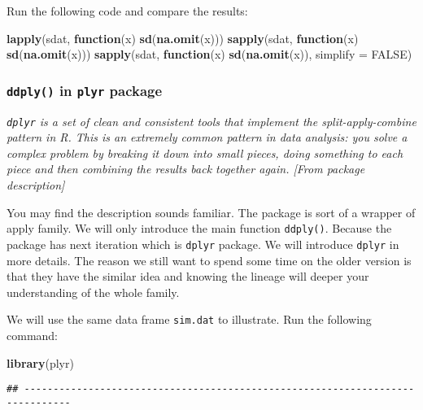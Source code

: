 \documentclass[
]{article}
\newenvironment{Shaded}{\begin{snugshade}}{\end{snugshade}}
\newcommand{\ControlFlowTok}[1]{\textcolor[rgb]{0.13,0.29,0.53}{\textbf{#1}}}
\newcommand{\DataTypeTok}[1]{\textcolor[rgb]{0.13,0.29,0.53}{#1}}
\newcommand{\KeywordTok}[1]{\textcolor[rgb]{0.13,0.29,0.53}{\textbf{#1}}}
\newcommand{\NormalTok}[1]{#1}
\newcommand{\OtherTok}[1]{\textcolor[rgb]{0.56,0.35,0.01}{#1}}
\begin{document}
Run the following code and compare the results:

\begin{Shaded}
\begin{Highlighting}[]
\KeywordTok{lapply}\NormalTok{(sdat, }\ControlFlowTok{function}\NormalTok{(x) }\KeywordTok{sd}\NormalTok{(}\KeywordTok{na.omit}\NormalTok{(x)))}
\KeywordTok{sapply}\NormalTok{(sdat, }\ControlFlowTok{function}\NormalTok{(x) }\KeywordTok{sd}\NormalTok{(}\KeywordTok{na.omit}\NormalTok{(x)))}
\KeywordTok{sapply}\NormalTok{(sdat, }\ControlFlowTok{function}\NormalTok{(x) }\KeywordTok{sd}\NormalTok{(}\KeywordTok{na.omit}\NormalTok{(x)), }\DataTypeTok{simplify =} \OtherTok{FALSE}\NormalTok{)}
\end{Highlighting}
\end{Shaded}

\hypertarget{ddply-in-plyr-package}{%
\subsubsection{\texorpdfstring{\texttt{ddply()} in \texttt{plyr}
package}{ddply() in plyr package}}\label{ddply-in-plyr-package}}

\emph{\texttt{dplyr} is a set of clean and consistent tools that
implement the split-apply-combine pattern in R. This is an extremely
common pattern in data analysis: you solve a complex problem by breaking
it down into small pieces, doing something to each piece and then
combining the results back together again. {[}From package
description{]}}

You may find the description sounds familiar. The package is sort of a
wrapper of apply family. We will only introduce the main function
\texttt{ddply()}. Because the package has next iteration which is
\texttt{dplyr} package. We will introduce \texttt{dplyr} in more
details. The reason we still want to spend some time on the older
version is that they have the similar idea and knowing the lineage will
deeper your understanding of the whole family.

We will use the same data frame \texttt{sim.dat} to illustrate. Run the
following command:

\begin{Shaded}
\begin{Highlighting}[]
\KeywordTok{library}\NormalTok{(plyr)}
\end{Highlighting}
\end{Shaded}

\begin{verbatim}
## ------------------------------------------------------------------------------
\end{verbatim}
\end{document}
